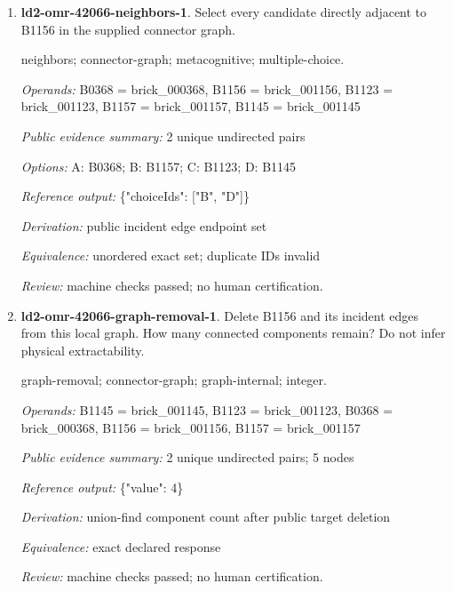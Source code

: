 \begin{enumerate}
\par{\small interface; connector-graph; metacognitive; single-choice.\par\textit{Operands:} B0994 = brick\_000994, B0988 = brick\_000988\par\textit{Public evidence summary:} \{"connectorRecord": \{"family": "stud", "aConnector": 8, "bConnector": 2\}, "scope": "Upstream connector tolerances and inset mesh intersections; unknown parts remain explicit, separate scene objects are not glued together; no load/force validation."\}\par\textit{Options:} A: ball; B: axle; C: stud; D: fixed; E: hinge\par\textit{Reference output:} \{"choiceId": "C"\}\par\textit{Derivation:} public connectorRecord.family equality\par\textit{Equivalence:} exact declared response\par\textit{Review:} machine checks passed; no human certification.}
\item \textbf{ld2-omr-42066-neighbors-1}. Select every candidate directly adjacent to B1156 in the supplied connector graph.
\par{\small neighbors; connector-graph; metacognitive; multiple-choice.\par\textit{Operands:} B0368 = brick\_000368, B1156 = brick\_001156, B1123 = brick\_001123, B1157 = brick\_001157, B1145 = brick\_001145\par\textit{Public evidence summary:} 2 unique undirected pairs\par\textit{Options:} A: B0368; B: B1157; C: B1123; D: B1145\par\textit{Reference output:} \{"choiceIds": ["B", "D"]\}\par\textit{Derivation:} public incident edge endpoint set\par\textit{Equivalence:} unordered exact set; duplicate IDs invalid\par\textit{Review:} machine checks passed; no human certification.}
\item \textbf{ld2-omr-42066-graph-removal-1}. Delete B1156 and its incident edges from this local graph. How many connected components remain? Do not infer physical extractability.
\par{\small graph-removal; connector-graph; graph-internal; integer.\par\textit{Operands:} B1145 = brick\_001145, B1123 = brick\_001123, B0368 = brick\_000368, B1156 = brick\_001156, B1157 = brick\_001157\par\textit{Public evidence summary:} 2 unique undirected pairs; 5 nodes\par\textit{Reference output:} \{"value": 4\}\par\textit{Derivation:} union-find component count after public target deletion\par\textit{Equivalence:} exact declared response\par\textit{Review:} machine checks passed; no human certification.}

\end{enumerate}
